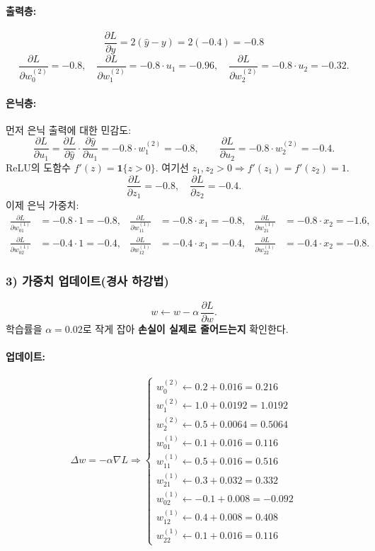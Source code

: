 \documentclass[12pt]{article}
\begin{document}
\paragraph{출력층:}
\[
\frac{\partial L}{\partial \hat{y}} = 2(\hat{y}-y)=2(-0.4)=-0.8
\]
\[
\frac{\partial L}{\partial w^{(2)}_0} = -0.8,\quad
\frac{\partial L}{\partial w^{(2)}_1} = -0.8\cdot u_1 = -0.96,\quad
\frac{\partial L}{\partial w^{(2)}_2} = -0.8\cdot u_2 = -0.32.
\]

\paragraph{은닉층:}
먼저 은닉 출력에 대한 민감도:
\[
\frac{\partial L}{\partial u_1} = \frac{\partial L}{\partial \hat{y}}\cdot \frac{\partial \hat{y}}{\partial u_1} = -0.8\cdot w^{(2)}_1 = -0.8,\qquad
\frac{\partial L}{\partial u_2} = -0.8\cdot w^{(2)}_2 = -0.4.
\]
ReLU의 도함수 \(f'(z)=\mathbf{1}\{z>0\}\). 여기선 \(z_1,z_2>0\Rightarrow f'(z_1)=f'(z_2)=1\).
\[
\frac{\partial L}{\partial z_1} = -0.8,\quad \frac{\partial L}{\partial z_2}=-0.4.
\]
이제 은닉 가중치:
\[
\begin{aligned}
\frac{\partial L}{\partial w^{(1)}_{01}} &= -0.8\cdot 1 = -0.8,&
\frac{\partial L}{\partial w^{(1)}_{11}} &= -0.8\cdot x_1 = -0.8, &
\frac{\partial L}{\partial w^{(1)}_{21}} &= -0.8\cdot x_2 = -1.6,\\
\frac{\partial L}{\partial w^{(1)}_{02}} &= -0.4\cdot 1 = -0.4,&
\frac{\partial L}{\partial w^{(1)}_{12}} &= -0.4\cdot x_1 = -0.4,&
\frac{\partial L}{\partial w^{(1)}_{22}} &= -0.4\cdot x_2 = -0.8.
\end{aligned}
\]

\subsubsection*{3) 가중치 업데이트(경사 하강법)}
\[
w \leftarrow w - \alpha \,\frac{\partial L}{\partial w}.
\]
학습률을 \(\alpha=0.02\)로 작게 잡아 \textbf{손실이 실제로 줄어드는지} 확인한다.

\paragraph{업데이트:}
\[
\Delta w = -\alpha \nabla L 
\Rightarrow
\begin{cases}
w^{(2)}_0 \!\!\leftarrow 0.2 + 0.016 = 0.216 \\
w^{(2)}_1 \!\!\leftarrow 1.0 + 0.0192 = 1.0192 \\
w^{(2)}_2 \!\!\leftarrow 0.5 + 0.0064 = 0.5064 \\
w^{(1)}_{01}\!\leftarrow 0.1 + 0.016 = 0.116 \\
w^{(1)}_{11}\!\leftarrow 0.5 + 0.016 = 0.516 \\
w^{(1)}_{21}\!\leftarrow 0.3 + 0.032 = 0.332 \\
w^{(1)}_{02}\!\leftarrow -0.1 + 0.008 = -0.092 \\
w^{(1)}_{12}\!\leftarrow 0.4 + 0.008 = 0.408 \\
w^{(1)}_{22}\!\leftarrow 0.1 + 0.016 = 0.116
\end{cases}
\]
\end{document}
